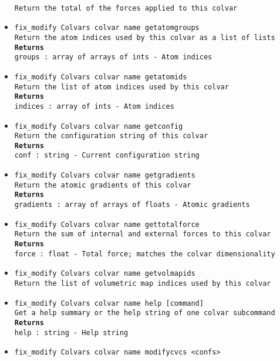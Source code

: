 \begin{itemize}
\\
\texttt{Return the total of the forces applied to this colvar}
\item \texttt{fix\_modify Colvars colvar name getatomgroups}
\\
\texttt{Return the atom indices used by this colvar as a list of lists}
\\
\texttt{\textbf{Returns}}
\\
\texttt{groups : array of arrays of ints - Atom indices}
\item \texttt{fix\_modify Colvars colvar name getatomids}
\\
\texttt{Return the list of atom indices used by this colvar}
\\
\texttt{\textbf{Returns}}
\\
\texttt{indices : array of ints - Atom indices}
\item \texttt{fix\_modify Colvars colvar name getconfig}
\\
\texttt{Return the configuration string of this colvar}
\\
\texttt{\textbf{Returns}}
\\
\texttt{conf : string - Current configuration string}
\item \texttt{fix\_modify Colvars colvar name getgradients}
\\
\texttt{Return the atomic gradients of this colvar}
\\
\texttt{\textbf{Returns}}
\\
\texttt{gradients : array of arrays of floats - Atomic gradients}
\item \texttt{fix\_modify Colvars colvar name gettotalforce}
\\
\texttt{Return the sum of internal and external forces to this colvar}
\\
\texttt{\textbf{Returns}}
\\
\texttt{force : float - Total force; matches the colvar dimensionality}
\item \texttt{fix\_modify Colvars colvar name getvolmapids}
\\
\texttt{Return the list of volumetric map indices used by this colvar}
\item \texttt{fix\_modify Colvars colvar name help [command]}
\\
\texttt{Get a help summary or the help string of one colvar subcommand}
\\
\texttt{\textbf{Returns}}
\\
\texttt{help : string - Help string}
\item \texttt{fix\_modify Colvars colvar name modifycvcs <confs>}

\end{itemize}
